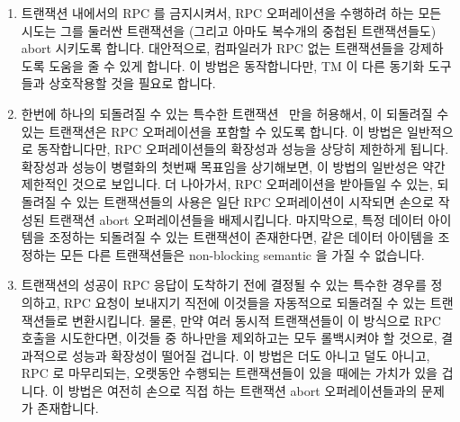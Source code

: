\begin{enumerate}
\item	트랜잭션 내에서의 RPC 를 금지시켜서, RPC 오퍼레이션을 수행하려 하는
	모든 시도는 그를 둘러싼 트랜잭션을 (그리고 아마도 복수개의 중첩된
	트랜잭션들도) abort 시키도록 합니다.
	대안적으로, 컴파일러가 RPC 없는 트랜잭션들을 강제하도록 도움을 줄 수
	있게 합니다.
	이 방법은 동작합니다만, TM 이 다른 동기화 도구들과 상호작용할 것을
	필요로 합니다.
\item	한번에 하나의 되돌려질 수 있는 특수한
	트랜잭션~\cite{SpearMichaelScott2008InevitableSTM} 만을 허용해서, 이
	되돌려질 수 있는 트랜잭션은 RPC 오퍼레이션을 포함할 수 있도록 합니다.
	이 방법은 일반적으로 동작합니다만, RPC 오퍼레이션들의 확장성과 성능을
	상당히 제한하게 됩니다.
	확장성과 성능이 병렬화의 첫번째 목표임을 상기해보면, 이 방법의 일반성은
	약간 제한적인 것으로 보입니다.
	더 나아가서, RPC 오퍼레이션을 받아들일 수 있는, 되돌려질 수 있는
	트랜잭션들의 사용은 일단 RPC 오퍼레이션이 시작되면 손으로 작성된
	트랜잭션 abort 오퍼레이션들을 배제시킵니다.
	마지막으로, 특정 데이터 아이템을 조정하는 되돌려질 수 있는 트랜잭션이
	존재한다면, 같은 데이터 아이템을 조정하는 모든 다른 트랜잭션들은
	non-blocking semantic 을 가질 수 없습니다.

\item	트랜잭션의 성공이 RPC 응답이 도착하기 전에 결정될 수 있는 특수한 경우를
	정의하고, RPC 요청이 보내지기 직전에 이것들을 자동적으로 되돌려질 수
	있는 트랜잭션들로 변환시킵니다.
	물론, 만약 여러 동시적 트랜잭션들이 이 방식으로 RPC 호출을 시도한다면,
	이것들 중 하나만을 제외하고는 모두 롤백시켜야 할 것으로, 결과적으로
	성능과 확장성이 떨어질 겁니다.
	이 방법은 더도 아니고 덜도 아니고, RPC 로 마무리되는, 오랫동안 수행되는
	트랜잭션들이 있을 때에는 가치가 있을 겁니다.
	이 방법은 여전히 손으로 직접 하는 트랜잭션 abort 오퍼레이션들과의
	문제가 존재합니다.
\iffalse


\end{enumerate}
